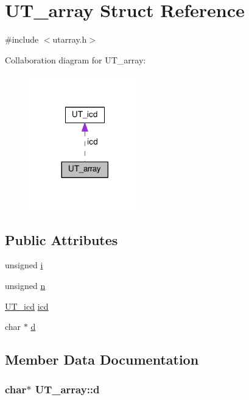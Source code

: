 \hypertarget{struct_u_t__array}{}\section{U\+T\+\_\+array Struct Reference}
\label{struct_u_t__array}


{\ttfamily \#include $<$utarray.\+h$>$}



Collaboration diagram for U\+T\+\_\+array\+:
\nopagebreak
\begin{figure}[H]
\begin{center}
\leavevmode
\includegraphics[width=137pt]{struct_u_t__array__coll__graph}
\end{center}
\end{figure}
\subsection*{Public Attributes}
\begin{DoxyCompactItemize}
\item 
unsigned \hyperlink{struct_u_t__array_add4a738223f032481193cc5901cef56e}{i}
\item 
unsigned \hyperlink{struct_u_t__array_a48798687ef8b6a5ba3fbe806520c5824}{n}
\item 
\hyperlink{struct_u_t__icd}{U\+T\+\_\+icd} \hyperlink{struct_u_t__array_a8308fc1e930b18b9561e713fd13e5997}{icd}
\item 
char $\ast$ \hyperlink{struct_u_t__array_aab8159eaea37e87d0af22c97758c7b77}{d}
\end{DoxyCompactItemize}


\subsection{Member Data Documentation}
\subsubsection[{\texorpdfstring{d}{d}}]{\setlength{\rightskip}{0pt plus 5cm}char$\ast$ U\+T\+\_\+array\+::d}\hypertarget{struct_u_t__array_aab8159eaea37e87d0af22c97758c7b77}{}\label{struct_u_t__array_aab8159eaea37e87d0af22c97758c7b77}
